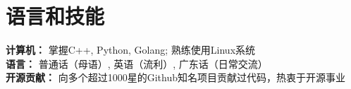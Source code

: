\documentclass[letterpaper,11pt]{article}
\makeatletter
\newcommand{\resumeOrganizationHeading}[4]{
  \vspace{-2pt}\item
    \begin{tabular*}{0.97\textwidth}[t]{l@{\extracolsep{\fill}}r}
      \textbf{#1} & \textit{\small #2} \\
      \textit{\small#3}
    \end{tabular*}\vspace{-7pt}
}
\newcommand{\resumeSubHeadingListStart}{\begin{itemize}[leftmargin=0.15in, label={}]}
\newcommand{\resumeSubHeadingListEnd}{\end{itemize}}
\makeatother
\begin{document}

\section{语言和技能}
  \vspace{2pt}
  \resumeSubHeadingListStart
    \small{\item{
        \textbf{计算机：}{ 掌握C++, Python, Golang; 熟练使用Linux系统 } \\ \vspace{3pt}
        \textbf{语言：}{ 普通话（母语）, 英语（流利）, 广东话（日常交流） } \\ \vspace{3pt}
        \textbf{开源贡献：}{ 向多个超过1000星的Github知名项目贡献过代码，热衷于开源事业 } \\
    }}
  \resumeSubHeadingListEnd




    
    




    
    








    



\end{document}
